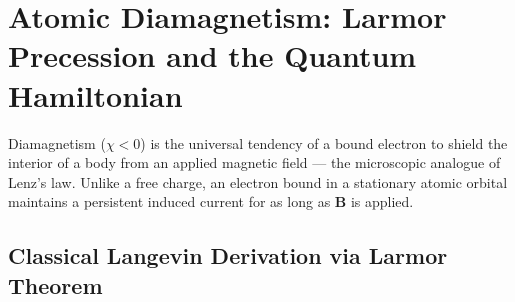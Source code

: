 \documentclass[11pt,a4paper]{article}
\newcommand{\vb}[1]{\mathbf{#1}}
\begin{document}
\section{Atomic Diamagnetism: Larmor Precession and the Quantum Hamiltonian}
\label{ch:diamagnetism}

Diamagnetism ($\chi < 0$) is the universal tendency of a bound electron to shield the interior of a body from an applied magnetic field --- the microscopic analogue of Lenz's law. Unlike a free charge, an electron bound in a stationary atomic orbital maintains a persistent induced current for as long as $\vb{B}$ is applied.

\subsection{Classical Langevin Derivation via Larmor Theorem}
\end{document}
